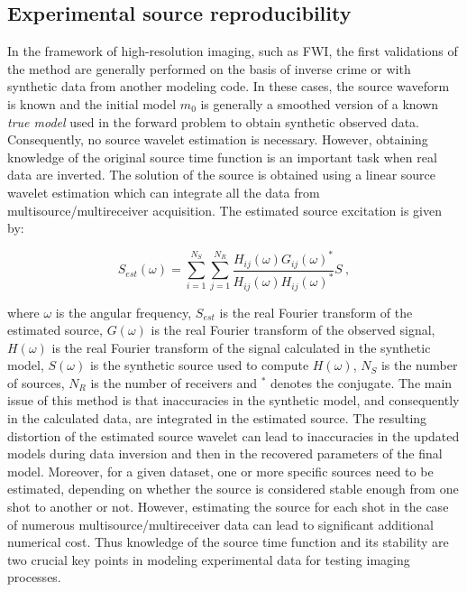 \documentclass[manuscript,revised]{geophysics}
\begin{document}
\subsection{Experimental source reproducibility}

\noindent In the framework of high-resolution imaging, such as FWI, the first validations of the method are generally performed on the basis of inverse crime or with synthetic data from another modeling code. In these cases, the source waveform is known and the initial model $m_{0}$ is generally a smoothed version of a known \textit{true model} used in the forward problem to obtain synthetic observed data. Consequently, no source wavelet estimation is necessary. However, obtaining knowledge of the original source time function is an important task when real data are inverted. The solution of the source is obtained using a linear source wavelet estimation \citep{Pratt_FWI_1999,Virieux_FWI_2009} which can integrate all the data from multisource/multireceiver acquisition. The estimated source excitation is given by:

\begin{equation}
S_{est}(\omega)=\sum\limits_{i=1}^{N_{S}}\sum\limits_{j=1}^{N_{R}}\frac{H_{ij}(\omega)G_{ij}(\omega)^{*}}{H_{ij}(\omega)H_{ij}(\omega)^{*}}S\ ,
\label{eq:lswe}
\end{equation}

\noindent where $\omega$ is the angular frequency, $S_{est}$ is the real Fourier transform of the estimated source, $G(\omega)$ is the real Fourier transform of the observed signal, $H(\omega)$ is the real Fourier transform of the signal calculated in the synthetic model, $S(\omega)$ is the synthetic source used to compute $H(\omega)$, $N_{S}$ is the number of sources, $N_{R}$ is the number of receivers and $^{*}$ denotes the conjugate. The main issue of this method is that inaccuracies in the synthetic model, and consequently in the calculated data, are integrated in the estimated source. %
The resulting distortion of the estimated source wavelet can lead to inaccuracies in the updated models during data inversion and then in the recovered parameters of the final model. Moreover, for a given dataset, one or more specific sources need to be estimated, depending on whether the source is considered stable enough from one shot to another or not. However, estimating the source for each shot in the case of numerous multisource/multireceiver data can lead to significant additional numerical cost. Thus knowledge of the source time function and its stability are two crucial key points in modeling experimental data for testing imaging processes.
\end{document}
